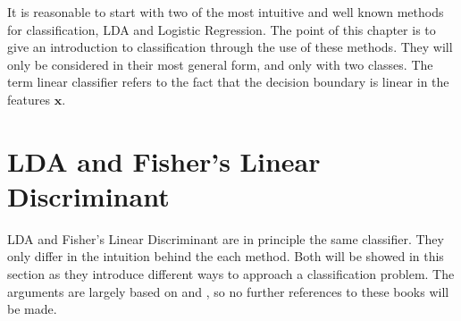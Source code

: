 %
It is reasonable to start with two of the most intuitive and well known methods for classification, LDA and Logistic Regression. 
The point of this chapter is to give an introduction to classification through the use of these methods. They will only be considered in their most general form, and only with two classes. The term linear classifier refers to the fact that the decision boundary is linear in the features $\mathbf{x}$.
%
\section{LDA and Fisher's Linear Discriminant}
\label{sec:LDA and Fisher's Linear Discriminant}
LDA and Fisher's Linear Discriminant are in principle the same classifier. They only differ in the intuition behind the each method. Both will be showed in this section as they introduce different ways to approach a classification problem. The arguments are largely based on \cite{bishop} and \cite{modstat}, so no further references to these books will be made. 

